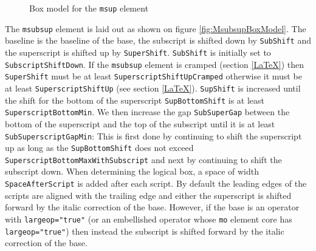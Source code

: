 \begin{figure}
\centering
\caption{Box model for the {\tt msup} element}
\label{fig:MsupBoxModel}
\end{figure}

The {\tt msubsup} element is laid out as shown on figure
\ref{fig:MsubsupBoxModel}.
The baseline is the baseline of the base, the subscript is shifted down
by {\tt SubShift} and the superscript is shifted up by {\tt SuperShift}.
{\tt SubShift} is initially set to {\tt SubscriptShiftDown}.
If the {\tt msubsup} element is cramped (section \ref{LaTeX}) then
{\tt SuperShift} must be at least
{\tt SuperscriptShiftUpCramped} otherwise
it must be at least {\tt SuperscriptShiftUp}
(see section \ref{LaTeX}).
{\tt SupShift} is increased until the shift for the bottom of the superscript
{\tt SupBottomShift} is at least {\tt SuperscriptBottomMin}.
We then increase the gap {\tt SubSuperGap} between the bottom of the superscript
and the top of the subscript until it is at least
{\tt SubSuperscriptGapMin}:
This is first done by continuing to shift the superscript up as long as the
{\tt SupBottomShift} does not exceed
{\tt SuperscriptBottomMaxWithSubscript}
and next by continuing to shift the subscript down. When determining
the logical box, a space of width {\tt SpaceAfterScript}
is added after
each script. By default the leading edges of the scripts are aligned with
the trailing edge and either the superscript is shifted forward by the italic
correction of the base. However, if the base is an operator with
{\tt largeop="true"} (or an embellished operator whose {\tt mo} element core
has {\tt largeop="true"}) then instead the subscript is shifted forward by the
italic correction of the base.

